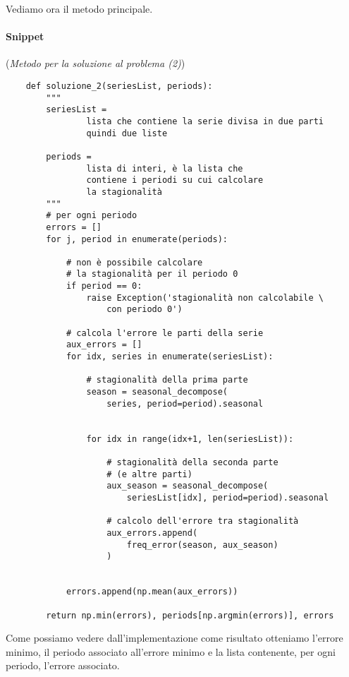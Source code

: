 Vediamo ora il metodo principale.
\paragraph*{Snippet} (\textit{Metodo per la soluzione al problema (2)})
\begin{verbatim}
    def soluzione_2(seriesList, periods):
        """ 
        seriesList = 
                lista che contiene la serie divisa in due parti
                quindi due liste

        periods = 
                lista di interi, è la lista che
                contiene i periodi su cui calcolare
                la stagionalità
        """
        # per ogni periodo
        errors = []
        for j, period in enumerate(periods):

            # non è possibile calcolare 
            # la stagionalità per il periodo 0
            if period == 0:
                raise Exception('stagionalità non calcolabile \
                    con periodo 0')

            # calcola l'errore le parti della serie
            aux_errors = []
            for idx, series in enumerate(seriesList):

                # stagionalità della prima parte
                season = seasonal_decompose(
                    series, period=period).seasonal

                
                for idx in range(idx+1, len(seriesList)):

                    # stagionalità della seconda parte 
                    # (e altre parti)
                    aux_season = seasonal_decompose(
                        seriesList[idx], period=period).seasonal
                    
                    # calcolo dell'errore tra stagionalità
                    aux_errors.append(
                        freq_error(season, aux_season)
                    )
            

            errors.append(np.mean(aux_errors))

        return np.min(errors), periods[np.argmin(errors)], errors
\end{verbatim}

Come possiamo vedere dall'implementazione come risultato otteniamo l'errore minimo, il periodo
associato all'errore minimo e la lista contenente, per ogni periodo, l'errore associato.

